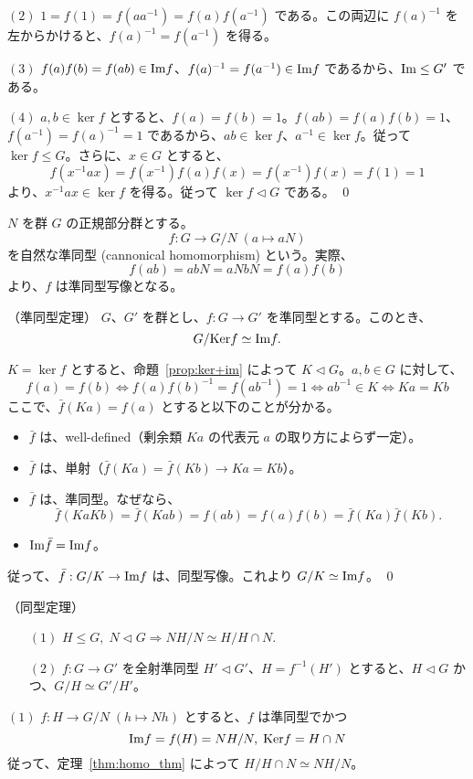 $(2)$ $1 = f(1) = f(aa^{-1}) = f(a)f(a^{-1})$ である。この両辺に $f(a)^{-1}$ を左からかけると、$f(a)^{-1} = f(a^{-1})$ を得る。

$(3)$ $f(a)f(b) = f(ab)\in \mbox{{\rm Im}} f$、$f(a)^{-1} = f(a^{-1})\in \mbox{{\rm Im}} f$ であるから、$\mbox{{\rm Im}}\leq G'$ である。

$(4)$ $a, b\in\ker f$ とすると、$f(a) = f(b) = 1$。$f(ab) = f(a)f(b) = 1$、$f(a^{-1}) = f(a)^{-1} = 1$ であるから、$ab\in \ker f$、$a^{-1}\in \ker f$。従って $\ker f\leq G$。さらに、$x\in G$ とすると、
$$f(x^{-1}ax) = f(x^{-1})f(a)f(x) = f(x^{-1})f(x) = f(1) = 1$$
より、$x^{-1}ax\in \ker f$ を得る。従って $\ker f\lhd G$ である。
\qed

\begin{eg}
$N$ を群 $G$ の正規部分群とする。
$$f: G\to G/N\;(a\mapsto aN)$$
を自然な準同型 (cannonical homomorphism) という。実際、
$$f(ab) = abN = aNbN = f(a)f(b)$$
より、$f$ は準同型写像となる。
\end{eg}

\newpage
{}
\begin{thm} {\rm （準同型定理）} \label{thm:homo_thm}
$G$、$G'$ を群とし、$f:G\to G'$ を準同型とする。このとき、
$$G/\mbox{{\rm Ker}} f \simeq \mbox{{\rm Im}} f.$$
\end{thm}
\proof
$K = \ker f$ とすると、命題~\ref{prop:ker+im} によって $K\lhd G$。$a,b\in G$ に対して、
$$f(a) = f(b) \Leftrightarrow f(a)f(b)^{-1} = f(ab^{-1}) = 1 \Leftrightarrow ab^{-1}\in K \Leftrightarrow Ka = Kb$$
ここで、$\bar{f}(Ka) = f(a)$ とすると以下のことが分かる。
\begin{itemize}
\item $\bar{f}$ は、well-defined（剰余類 $Ka$ の代表元 $a$ の取り方によらず一定）。
\item $\bar{f}$ は、単射（$\bar{f}(Ka) = \bar{f}(Kb) \to Ka = Kb$）。
\item $\bar{f}$ は、準同型。なぜなら、
$$\bar{f}(KaKb) = \bar{f}(Kab) = f(ab) = f(a)f(b) = \bar{f}(Ka)\bar{f}(Kb).$$
\item $\mbox{{\rm Im}} \bar{f} = \mbox{{\rm Im}} f$。
\end{itemize}
従って、$\bar{f}:G/K \to \mbox{{\rm Im}} f$ は、同型写像。これより $G/K\simeq \mbox{{\rm Im}} f$。
\qed

\begin{thm} {\rm （同型定理）} \label{thm:isom_thm}
\begin{itemize}
\item[$(1)$] $H\leq G, \;N\lhd G \Rightarrow NH/N \simeq H/H\cap N$.
\item[$(2)$] $f:G\to G'$ を全射準同型 $H'\lhd G'$、$H = f^{-1}(H')$ とすると、$H\lhd G$ かつ、$G/H \simeq G'/H'$。
\end{itemize}
\end{thm}
\proof
$(1)$ $f:H \to G/N\;(h\mapsto Nh)$  とすると、$f$ は準同型でかつ
$$\mbox{{\rm Im}} f = f(H) = NH/N,\;\mbox{{\rm Ker}} f = H\cap N$$
従って、定理~\ref{thm:homo_thm} によって $H/H\cap N\simeq NH/N$。

